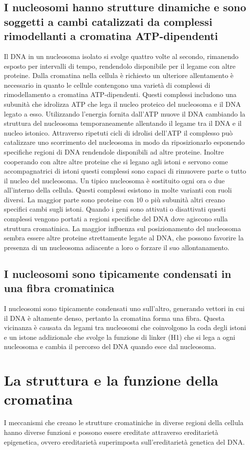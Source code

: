 \subsection{I nucleosomi hanno strutture dinamiche e sono soggetti a cambi catalizzati da complessi rimodellanti a cromatina ATP-dipendenti}
Il DNA in un nucleosoma isolato si svolge quattro volte al secondo, rimanendo esposto per intervalli di tempo, rendendolo disponibile per il legame con altre proteine. Dalla
cromatina nella cellula \`e richiesto un ulteriore allentamento \`e necessario in quanto le cellule contengono una variet\`a di complessi di rimodellamento a cromatina ATP-dipendenti.
Questi complessi includono una subunit\`a che idrolizza ATP che lega il nucleo proteico del nucleosoma e il DNA legato a esso. Utilizzando l'energia fornita dall'ATP muove il DNA
cambiando la struttura del nucleosoma temporaneamente allentando il legame tra il DNA e il nucleo istonico. Attraverso ripetuti cicli di idrolisi dell'ATP il complesso pu\`o catalizzare
uno scorrimento del nucleosoma in modo da riposizionarlo esponendo specifiche regioni di DNA rendendole disponibili ad altre proteine. Inoltre cooperando con altre altre proteine che si
legano agli istoni e servono come accompagnatrici di istoni questi complessi sono capaci di rimuovere parte o tutto il nucleo del nucleosoma. Un tipico nucleosoma \`e sostituito ogni
ora o due all'interno della cellula. Questi complessi esistono in molte varianti con ruoli diversi. La maggior parte sono proteine con $10$ o pi\`u subunit\`a altri creano specifici
cambi sugli istoni. Quando i geni sono attivati o disattivati questi complessi vengono portati a regioni specifiche del DNA dove agiscono sulla struttura cromatinica. La maggior 
influenza sul posizionamento del nucleosoma sembra essere altre proteine strettamente legate al DNA, che possono favorire la presenza di un nucleosoma adiacente a loro o forzare il 
suo allontanamento. 
\subsection{I nucleosomi sono tipicamente condensati in una fibra cromatinica}
I nucleosomi sono tipicamente condensati uno sull'altro, generando vettori in cui il DNA \`e altamente denso, pertanto la cromatina forma una fibra. Questa vicinanza \`e causata da 
legami tra nucleosomi che coinvolgono la coda degli istoni e un istone addizionale che svolge la funzione di linker (H1) che si lega a ogni nucleosoma e cambia il percorso del DNA 
quando esce dal nucleosoma. 
\section{La struttura e la funzione della cromatina}
I meccanismi che creano le strutture cromatiniche in diverse regioni della cellula hanno diverse funzioni e possono essere ereditate attraverso ereditariet\`a epigenetica, ovvero 
ereditariet\`a superimposta sull'ereditariet\`a genetica del DNA. 
